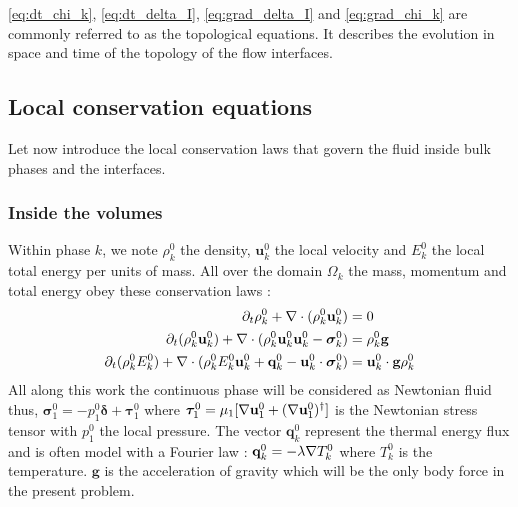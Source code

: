\ref{eq:dt_chi_k}, \ref{eq:dt_delta_I}, \ref{eq:grad_delta_I} and \ref{eq:grad_chi_k} are commonly referred to as the topological equations. 
It describes the evolution in space and time of the topology of the flow interfaces.

\subsection{Local conservation equations}
\label{sec:local_eq}
Let now introduce the local conservation laws that govern the fluid inside bulk phases and the interfaces. 

\subsubsection{Inside the volumes}

Within phase $k$, we note $\rho_k^0$ the density, $\textbf{u}_k^0$ the local velocity and $E_k^0$ the local total energy per units of mass.
All over the domain $\Omega_k$ the mass, momentum and total energy obey these conservation laws :
\begin{align}
    \label{eq:dt_rho}
    \partial_t \rho_k^0  
    + \mathbf{\nabla}\cdot (
        \rho_k^0\textbf{u}_k^0
    )
    &= 
    0\\
    \label{eq:dt_rhou_k}
    \partial_t (\rho_k^0\textbf{u}_k^0)  
    + \mathbf{\nabla}\cdot (
        \rho_k^0\textbf{u}_k^0\textbf{u}_k^0
        - \bm{\sigma}_k^0 
    )
    &= 
    \rho_k^0 \textbf{g}\\
    \label{eq:dt_rhoE_k}
    \partial_t (\rho_k^0E_k^0)  
    + \mathbf{\nabla}\cdot (
        \rho_k^0E_k^0\textbf{u}_k^0
        + \textbf{q}_k^0
        - \textbf{u}_k^0 \cdot \bm{\sigma}_k^0 
        )
    &= 
    \textbf{u}_k^0 \cdot \textbf{g}  \rho_k^0
\end{align} 
All along this work the continuous phase will be considered as Newtonian fluid thus, $\bm{\sigma}_1^0 = - p_1^0 \bm\delta + \bm{\tau}_1^0$ where $\bm{\tau}_1^0 = \mu_1[\mathbf{\nabla} \textbf{u}_1^0+(\mathbf{\nabla} \textbf{u}_1^0)^\dagger]$ is the Newtonian stress tensor with $p_1 ^0$ the local pressure. 
The vector $\textbf{q}_k^0$ represent the thermal energy flux and is often model with a Fourier law : $\textbf{q}_k^0 = -\lambda \mathbf{\nabla} T_k^0$ where $T_k^0$ is the temperature. 
$\textbf{g}$ is the acceleration of gravity which will be the only body force in the present problem. 

